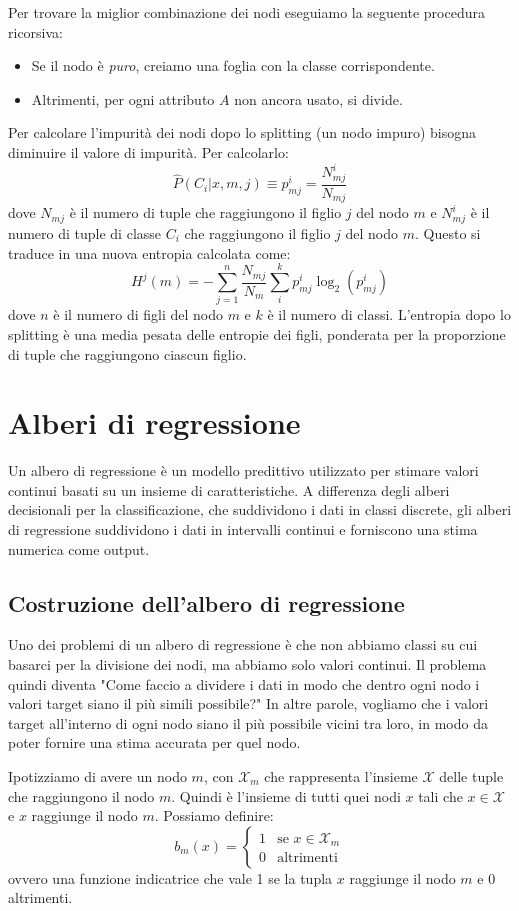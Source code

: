 Per trovare la miglior combinazione dei nodi eseguiamo la seguente procedura ricorsiva:
\begin{itemize}
    \item Se il nodo è \emph{puro}, creiamo una foglia con la classe corrispondente.
    \item Altrimenti, per ogni attributo $A$ non ancora usato, si divide.
\end{itemize}

Per calcolare l'impurità dei nodi dopo lo splitting (un nodo impuro) bisogna diminuire il valore di impurità. Per calcolarlo:
\[
\hat{P}(C_i | x, m, j) \equiv p_{mj}^i = \frac{N_{mj}^i}{N_{mj}}
\]
dove $N_{mj}$ è il numero di tuple che raggiungono il figlio $j$ del nodo $m$ e $N_{mj}^i$ è il numero di tuple di classe $C_i$ che raggiungono il figlio $j$ del nodo $m$. Questo si traduce in una nuova entropia calcolata come:
\[
H^j(m) = - \sum_{j=1}^n \frac{N_{mj}}{N_m} \sum_{i}^k p_{mj}^i \log_2(p_{mj}^i)
\]
dove $n$ è il numero di figli del nodo $m$ e $k$ è il numero di classi. L'entropia dopo lo splitting è una media pesata delle entropie dei figli, ponderata per la proporzione di tuple che raggiungono ciascun figlio. 

\section{Alberi di regressione}
Un albero di regressione è un modello predittivo utilizzato per stimare valori continui basati su un insieme di caratteristiche. A differenza degli alberi decisionali per la classificazione, che suddividono i dati in classi discrete, gli alberi di regressione suddividono i dati in intervalli continui e forniscono una stima numerica come output. 

\subsection{Costruzione dell'albero di regressione}
Uno dei problemi di un albero di regressione è che non abbiamo classi su cui basarci per la divisione dei nodi, ma abbiamo solo valori continui. Il problema quindi diventa "Come faccio a dividere i dati in modo che dentro ogni nodo i valori target siano il più simili possibile?" In altre parole, vogliamo che i valori target all'interno di ogni nodo siano il più possibile vicini tra loro, in modo da poter fornire una stima accurata per quel nodo.

Ipotizziamo di avere un nodo $m$, con $\mathcal{X}_m$ che rappresenta l'insieme $\mathcal{X}$ delle tuple che raggiungono il nodo $m$. Quindi è l'insieme di tutti quei nodi $x$ tali che $x \in \mathcal{X}$ e $x$ raggiunge il nodo $m$. Possiamo definire:
\[
b_m(x) = 
\begin{cases}
1 & \text{se } x \in \mathcal{X}_m \\
0 & \text{altrimenti}
\end{cases}
\]
ovvero una funzione indicatrice che vale 1 se la tupla $x$ raggiunge il nodo $m$ e 0 altrimenti.

